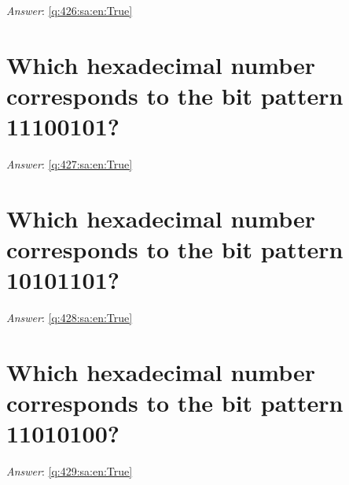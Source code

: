 \documentclass[a4paper,11pt,oneside]{book}
\begin{document}
\begin{sloppypar}
\label{q:426:sa:en:False}

\vspace{2cm}

\noindent\makebox[\textwidth]{\hrulefill}

\vspace{1cm}

\textit{Answer}: \autoref{q:426:sa:en:True}



\section{Which hexadecimal number corresponds to the bit pattern 11100101?}

\label{q:427:sa:en:False}

\vspace{2cm}

\noindent\makebox[\textwidth]{\hrulefill}

\vspace{1cm}

\textit{Answer}: \autoref{q:427:sa:en:True}



\section{Which hexadecimal number corresponds to the bit pattern 10101101?}

\label{q:428:sa:en:False}

\vspace{2cm}

\noindent\makebox[\textwidth]{\hrulefill}

\vspace{1cm}

\textit{Answer}: \autoref{q:428:sa:en:True}



\section{Which hexadecimal number corresponds to the bit pattern 11010100?}

\label{q:429:sa:en:False}

\vspace{2cm}

\noindent\makebox[\textwidth]{\hrulefill}

\vspace{1cm}

\textit{Answer}: \autoref{q:429:sa:en:True}




\end{sloppypar}
\end{document}
